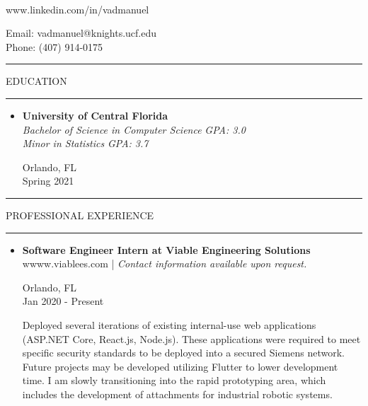 \documentclass{article}
\makeatletter
\newcommand{\name}{Manuel Vasquez}
\newcommand{\website}{www.linkedin.com/in/vadmanuel}
\newcommand{\email}{vadmanuel@knights.ucf.edu}
\newcommand{\phone}{(407) 914-0175}
\newcommand{\makeminipage}[4]{
    \begin{minipage}[c]{.7\linewidth}
        \flushleft #1 \\ #2
    \end{minipage} \hfill
    \begin{minipage}[c]{.29\linewidth}
        \flushright #3 \\ #4
    \end{minipage}
}
\newcommand{\makesection}[1]{\hrule\vskip1mm\uppercase{#1}\vskip1mm\hrule}
\makeatother
\begin{document}
\setlength{\parindent}{0cm}

\makeminipage
    {{\large\textbf{\name}}}
    {\website}
    {Email: \email}
    {Phone: \phone}
\bigbreak

\makesection{Education}
\begin{itemize}[leftmargin=.35cm]
    \item {
    \makeminipage
        {\textbf{University of Central Florida}}
        {\textit{Bachelor of Science in Computer Science}\hspace*{2mm} \textit{GPA: 3.0} \\
        \textit{Minor in Statistics}\hspace*{36.4mm} \textit{GPA: 3.7}}
        {Orlando, FL}
        {Spring 2021}
    }
\end{itemize}

\makesection{Professional Experience}
\begin{itemize}[leftmargin=.35cm]
    \item {
        \makeminipage
            {\textbf{Software Engineer Intern at Viable Engineering Solutions}}
            {wwww.viablees.com | \textit{Contact information available upon request.}}
            {Orlando, FL}
            {Jan 2020 - Present}

        Deployed several iterations of existing internal-use web applications (ASP.NET Core, React.js, Node.js). These applications were required to meet specific security standards to be deployed into a secured Siemens network. Future projects may be developed utilizing Flutter to lower development time. I am slowly transitioning into the rapid prototyping area, which includes the development of attachments for industrial robotic systems.
    }
\end{itemize}
\end{document}
